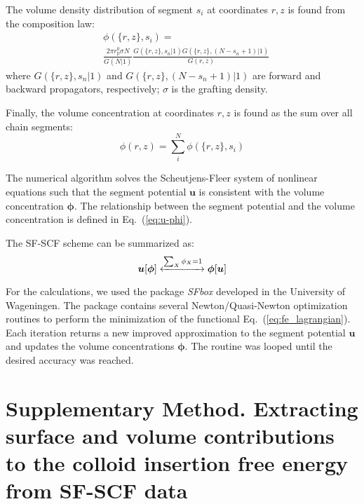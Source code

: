 \documentclass[10pt, a4paper]{article}
\begin{document}
\begin{multicols}{2}
The volume density distribution of segment $s_i$ at coordinates $r, z$ is found from the composition law:
\begin{equation}
    \label{eq:propagation}
    \begin{aligned}
        &\phi(\{r, z\}, s_i) = \\
        &\frac{2 \pi r_{\text{p}}^{0} \sigma N}{G(N|1)}
        \frac{G(\{r, z\}, s_n | 1) G(\{r, z\}, (N - s_n + 1) | 1)}{G(r, z)}
    \end{aligned}
\end{equation}
where $G(\{r, z\}, s_n | 1)$ and $G(\{r, z\}, (N - s_n + 1) | 1)$ are forward and backward propagators, respectively; $\sigma$ is the grafting density.

Finally, the volume concentration at coordinates $r, z$ is found as the sum over all chain segments:
\begin{equation}
    \phi(r, z) = \sum_{i}^{N} \phi(\{r, z\}, s_i)
\end{equation}

The numerical algorithm solves the Scheutjens-Fleer system of nonlinear equations such that the segment potential $\mathbf{u}$ is consistent with the volume concentration $\boldsymbol{\phi}$.
The relationship between the segment potential and the volume concentration is defined in Eq.~(\ref{eq:u-phi}).

The SF-SCF scheme can be summarized as:
\begin{equation}
    \boldsymbol{u}[\boldsymbol{\phi}] \xleftrightarrow[]{\sum_{X} \phi_X = 1} \boldsymbol{\phi}[\boldsymbol{u}]
\end{equation}

For the calculations, we used the package \emph{SFbox} developed in the University of Wageningen.
The package contains several Newton/Quasi-Newton optimization routines to perform the minimization of the functional Eq.~(\ref{eq:fe_lagrangian}).
Each iteration returns a new improved approximation to the segment potential $\mathbf{u}$ and updates the volume concentrations $\mathbf{\phi}$.
The routine was looped until the desired accuracy was reached.

\end{multicols}


\section{Supplementary Method. Extracting surface and volume contributions to the colloid insertion free energy from SF-SCF data}
\end{document}

